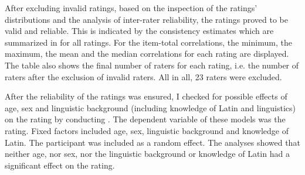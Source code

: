 After excluding invalid ratings, based on the inspection of the ratings' distributions and the analysis of inter-rater reliability, the ratings proved to be valid and reliable. This is indicated by the consistency estimates which are summarized in  for all ratings. For the item-total correlations, the minimum, the maximum, the mean and the median correlations for each rating are displayed. The table also shows the final number of raters for each rating, i.e. the number of raters after the exclusion of invalid raters. All in all, 23 raters were excluded.


\begin{table}
	\caption{Overview consistency estimates for all ratings in corpus study}
	\label{tbl:Overview consistency estimates for all ratings in corpus studys}
	
	
\end{table}



After the reliability of the ratings was ensured, I checked for possible effects of age, sex and linguistic background (including knowledge of Latin and linguistics) on the rating by conducting . The dependent variable of these models was the rating. Fixed factors included age, sex, linguistic background and knowledge of Latin. The participant was included as a random effect. The analyses showed that neither age, nor sex,  nor the linguistic background or knowledge of Latin had a significant effect on the rating.

